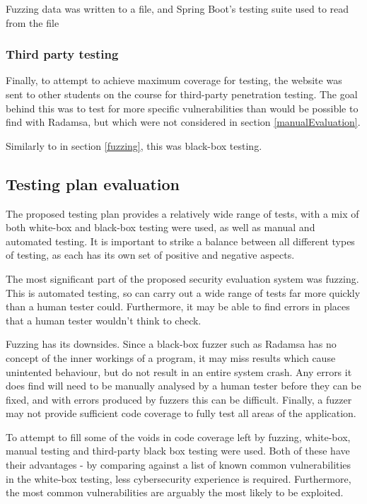Fuzzing data was written to a file, and Spring Boot's testing suite used to read from the file

\subsubsection{Third party testing}

Finally, to attempt to achieve maximum coverage for testing, the website was sent to other students on the course for third-party penetration testing. The goal behind this was to test for more specific vulnerabilities than would be possible to find with Radamsa, but which were not considered in section \ref{manualEvaluation}.

Similarly to in section \ref{fuzzing}, this was black-box testing. 

\subsection{Testing plan evaluation}

The proposed testing plan provides a relatively wide range of tests, with a mix of both white-box and  black-box testing were used, as well as manual and automated testing. It is important to strike a balance between all different types of testing, as each has its own set of positive and negative aspects. 

The most significant part of the proposed security evaluation system was fuzzing. This is automated testing, so can carry out a wide range of tests far more quickly than a human tester could. Furthermore, it may be able to find errors in places that a human tester wouldn't think to check. 

Fuzzing has its downsides. Since a black-box fuzzer such as Radamsa has no concept of the inner workings of a program, it may miss results which cause unintented behaviour, but do not result in an entire system crash. Any errors it does find will need to be manually analysed by a human tester before they can be fixed, and with errors produced by fuzzers this can be difficult. Finally, a fuzzer may not provide sufficient code coverage to fully test all areas of the application.  \cite{mwrFuzzing}

To attempt to fill some of the voids in code coverage left by fuzzing, white-box, manual testing and third-party black box testing were used. Both of these have their advantages - by comparing against a list of known common vulnerabilities in the white-box testing, less cybersecurity experience is required. Furthermore, the most common vulnerabilities are arguably the most likely to be exploited. 

